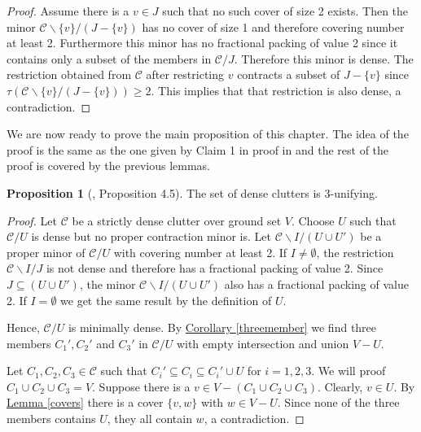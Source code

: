 \documentclass[a4paper, 12pt]{scrbook}
\theoremstyle{definition}
\newtheorem{proposition}[theorem]{Proposition}
\begin{document}
   \begin{proof}
       Assume there is a $v \in J$ such that no such cover of size 2 exists.
       Then the minor $\mathcal{C} \backslash \{v\} / (J-\{v\})$ has no cover of size 1 and therefore covering number at least 2.
       Furthermore this minor has no fractional packing of value 2 since it contains only a subset of the members in $\mathcal{C} / J$.
       Therefore this minor is dense.
       The restriction obtained from $\mathcal{C}$ after restricting $v$ contracts a subset of $J-\{v\}$ since $\tau(\mathcal{C} \backslash \{v\} / (J-\{v\}))\geq 2$.
       This implies that that restriction is also dense, a contradiction.
   \end{proof}

   We are now ready to prove the main proposition of this chapter.
   The idea of the proof is the same as the one given by Claim 1 in proof in \cite{restrictions} and the rest of the proof is covered by the previous lemmas.
   \begin{proposition}[\cite{restrictions}, Proposition 4.5]
       The set of dense clutters is 3-unifying.
   \end{proposition}

   \begin{proof}
       Let $\mathcal{C}$ be a strictly dense clutter over ground set $V$.
       Choose $U$ such that $\mathcal{C} / U$ is dense but no proper contraction minor is.
       Let $\mathcal{C} \backslash I / (U \cup U')$ be a proper minor of $\mathcal{C} /U$ with covering number at least 2.
       If $I \neq \emptyset$, the restriction $\mathcal{C} \backslash I / J$ is not dense and therefore has a fractional packing of value 2.
       Since $J \subseteq (U \cup U')$, the minor $\mathcal{C} \backslash I / (U \cup U')$ also has a fractional packing of value 2.
       If $I=\emptyset$ we get the same result by the definition of $U$.

       Hence, $\mathcal{C}/U$ is minimally dense.
       By \hyperref[threemember]{Corollary \ref*{threemember}} we find three members $C_1', C_2'$ and $C_3'$ in $\mathcal{C}/U$ with empty intersection and union $V - U$.

       Let $C_1, C_2, C_3 \in \mathcal{C}$ such that $C_i' \subseteq C_i \subseteq C_i' \cup U$ for $i=1,2,3$.
       We will proof $C_1 \cup C_2 \cup C_3 = V$.
       Suppose there is a $v \in V-(C_1 \cup C_2 \cup C_3)$.
       Clearly, $v \in U$.
       By \hyperref[covers]{Lemma \ref*{covers}} there is a cover $\{v,w\}$ with $w \in V-U$.
       Since none of the three members contains $U$, they all contain $w$, a contradiction.
   \end{proof}
\end{document}
